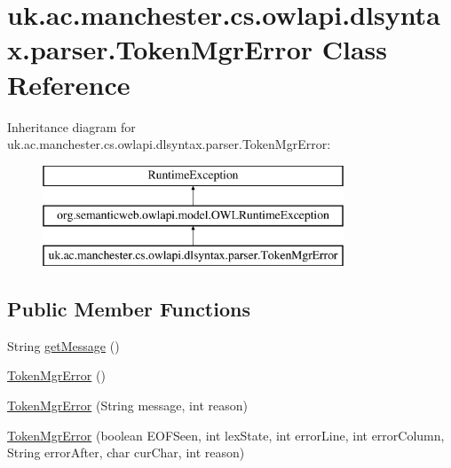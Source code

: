 \hypertarget{classuk_1_1ac_1_1manchester_1_1cs_1_1owlapi_1_1dlsyntax_1_1parser_1_1_token_mgr_error}{\section{uk.\-ac.\-manchester.\-cs.\-owlapi.\-dlsyntax.\-parser.\-Token\-Mgr\-Error Class Reference}
\label{classuk_1_1ac_1_1manchester_1_1cs_1_1owlapi_1_1dlsyntax_1_1parser_1_1_token_mgr_error}
}
Inheritance diagram for uk.\-ac.\-manchester.\-cs.\-owlapi.\-dlsyntax.\-parser.\-Token\-Mgr\-Error\-:\begin{figure}[H]
\begin{center}
\leavevmode
\includegraphics[height=3.000000cm]{classuk_1_1ac_1_1manchester_1_1cs_1_1owlapi_1_1dlsyntax_1_1parser_1_1_token_mgr_error}
\end{center}
\end{figure}
\subsection*{Public Member Functions}
\begin{DoxyCompactItemize}
\item 
String \hyperlink{classuk_1_1ac_1_1manchester_1_1cs_1_1owlapi_1_1dlsyntax_1_1parser_1_1_token_mgr_error_a01365cc9db241744fc6b21707de01c13}{get\-Message} ()
\item 
\hyperlink{classuk_1_1ac_1_1manchester_1_1cs_1_1owlapi_1_1dlsyntax_1_1parser_1_1_token_mgr_error_aa0db2b613e1fd183dba1aea709784993}{Token\-Mgr\-Error} ()
\item 
\hyperlink{classuk_1_1ac_1_1manchester_1_1cs_1_1owlapi_1_1dlsyntax_1_1parser_1_1_token_mgr_error_ad6c0dd02efaa750744400ca36b2dc7d5}{Token\-Mgr\-Error} (String message, int reason)
\item 
\hyperlink{classuk_1_1ac_1_1manchester_1_1cs_1_1owlapi_1_1dlsyntax_1_1parser_1_1_token_mgr_error_ac50e25273b5cfebd6c4aa70ff8c92bbd}{Token\-Mgr\-Error} (boolean E\-O\-F\-Seen, int lex\-State, int error\-Line, int error\-Column, String error\-After, char cur\-Char, int reason)
\end{DoxyCompactItemize}
